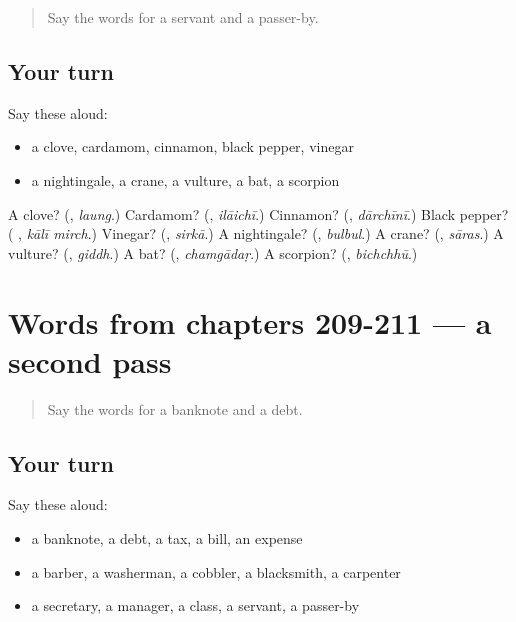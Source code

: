 \begin{quote}
Say the words for a servant and a passer-by.
\end{quote}

\subsection*{Your turn}
Say these aloud:

\begin{itemize}
\raggedright
  \item a clove, cardamom, cinnamon, black pepper, vinegar
  \item a nightingale, a crane, a vulture, a bat, a scorpion
\end{itemize}

\begin{tcolorbox}[breakable,colback=teal!4,colframe=teal!35!black,title={Before you move on}]
A clove? (\textbf{}, \emph{laung}.) Cardamom? (\textbf{}, \emph{ilāichī}.) Cinnamon? (\textbf{}, \emph{dārchīnī}.) Black pepper? (\textbf{ }, \emph{kālī mirch}.) Vinegar? (\textbf{}, \emph{sirkā}.) A nightingale? (\textbf{}, \emph{bulbul}.) A crane? (\textbf{}, \emph{sāras}.) A vulture? (\textbf{}, \emph{giddh}.) A bat? (\textbf{}, \emph{chamgādaṛ}.) A scorpion? (\textbf{}, \emph{bichchhū}.)
\end{tcolorbox}
\section[(dialogue)]{Words from chapters 209-211 — a second pass}

\label{lesson:UR-R211-second-pass-words-from-chapters-209-211}



\begin{quote}
Say the words for a banknote and a debt.
\end{quote}

\subsection*{Your turn}
Say these aloud:

\begin{itemize}
\raggedright
  \item a banknote, a debt, a tax, a bill, an expense
  \item a barber, a washerman, a cobbler, a blacksmith, a carpenter
  \item a secretary, a manager, a class, a servant, a passer-by
\end{itemize}

